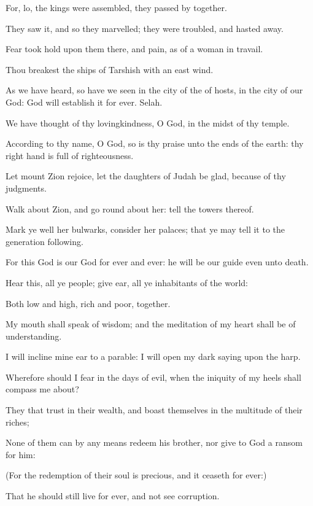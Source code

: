 \Verse For, lo, the kings were assembled, they passed by together.

\Verse They saw it, and so they marvelled; they were troubled, and hasted away.

\Verse Fear took hold upon them there, and pain, as of a woman in travail.

\Verse Thou breakest the ships of Tarshish with an east wind.

\Verse As we have heard, so have we seen in the city of the \LORD of hosts, in the city of our God: God will establish it for ever. Selah.

\Verse We have thought of thy lovingkindness, O God, in the midst of thy temple.

\Verse According to thy name, O God, so is thy praise unto the ends of the earth: thy right hand is full of righteousness.

\Verse Let mount Zion rejoice, let the daughters of Judah be glad, because of thy judgments.

\Verse Walk about Zion, and go round about her: tell the towers thereof.

\Verse Mark ye well her bulwarks, consider her palaces; that ye may tell it to the generation following.

\Verse For this God is our God for ever and ever: he will be our guide even unto death.




\Chapter
\Verse Hear this, all ye people; give ear, all ye inhabitants of the world:

\Verse Both low and high, rich and poor, together.

\Verse My mouth shall speak of wisdom; and the meditation of my heart shall be of understanding.

\Verse I will incline mine ear to a parable: I will open my dark saying upon the harp.

\Verse Wherefore should I fear in the days of evil, when the iniquity of my heels shall compass me about?

\Verse They that trust in their wealth, and boast themselves in the multitude of their riches;

\Verse None of them can by any means redeem his brother, nor give to God a ransom for him:

\Verse (For the redemption of their soul is precious, and it ceaseth for ever:)

\Verse That he should still live for ever, and not see corruption.

